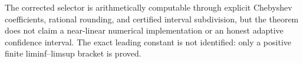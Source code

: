 The corrected selector is arithmetically computable through explicit Chebyshev coefficients, rational rounding, and certified interval subdivision, but the theorem does not claim a near-linear numerical implementation or an honest adaptive confidence interval.  The exact leading constant is not identified: only a positive finite liminf--limsup bracket is proved.